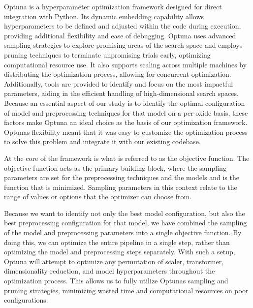 Optuna is a hyperparameter optimization framework designed for direct integration with Python. Its dynamic embedding capability allows hyperparameters to be defined and adjusted within the code during execution, providing additional flexibility and ease of debugging. 
Optuna uses advanced sampling strategies to explore promising areas of the search space and employs pruning techniques to terminate unpromising trials early, optimizing computational resource use. 
It also supports scaling across multiple machines by distributing the optimization process, allowing for concurrent optimization. 
Additionally, tools are provided to identify and focus on the most impactful parameters, aiding in the efficient handling of high-dimensional search spaces. \cite{optuna_2019} 
Because an essential aspect of our study is to identify the optimal configuration of model and preprocessing techniques for that model on a per-oxide basis, these factors make Optuna an ideal choice as the basis of our optimization framework.
Optunas flexibility meant that it was easy to customize the optimization process to solve this problem and integrate it with our existing codebase.

At the core of the framework is what is referred to as the objective function.
The objective function acts as the primary building block, where the sampling parameters are set for the preprocessing techniques and the models and is the function that is minimized. %
Sampling parameters in this context relate to the range of values or options that the optimizer can choose from.

Because we want to identify not only the best model configuration, but also the best preprocessing configuration for that model, we have combined the sampling of the model and preprocessing parameters into a single objective function.
By doing this, we can optimize the entire pipeline in a single step, rather than optimizing the model and preprocessing steps separately.
With such a setup, Optuna will attempt to optimize any permutation of scaler, transformer, dimensionality reduction, and model hyperparameters throughout the optimization process.
This allows us to fully utilize Optunas sampling and pruning strategies, minimizing wasted time and computational resources on poor configurations.

